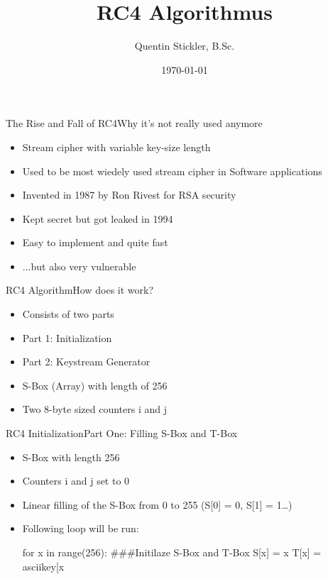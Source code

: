 \documentclass[
	aspectratio=169,	%
	onlytextwidth,		%
	t,					%
	]{beamer}
\title[RC4-Algorithmus]{RC4 Algorithmus}
\author[Quentin Stickler]{Quentin Stickler, B.Sc.}
\date{\today} %
\begin{document}
\begin{frame}[fragile]{The Rise and Fall of RC4}{Why it's not really used anymore}
	\begin{itemize}
		\item Stream cipher with variable key-size length
		\item Used to be most wiedely used stream cipher in Software applications
		\item Invented in 1987 by Ron Rivest for RSA security
		\item Kept secret but got leaked in 1994
		\item Easy to implement and quite fast
		\item ...but also very vulnerable
		
	\end{itemize}
\end{frame}



\begin{frame}[fragile]{RC4 Algorithm}{How does it work?}
	\begin{itemize}
		\item Consists of two parts
		\item Part 1: Initialization
		\item Part 2: Keystream Generator
		\item S-Box (Array) with length of 256
		\item Two 8-byte sized counters i and j
	\end{itemize}
\end{frame}

\begin{frame}[fragile]{RC4 Initialization}{Part One: Filling S-Box and T-Box}
	\begin{itemize}
		\item S-Box with length 256
		\item Counters i and j set to 0
		\item Linear filling of the S-Box from 0 to 255 (S[0] = 0, S[1] = 1\dots)
		\item Following loop will be run:

		\begin{python}
			for x in range(256):		###Initilaze S-Box and T-Box
			S[x] = x
			T[x] = asciikey[x %
		\end{python}
		
	\end{itemize}
\end{frame}
\end{document}
